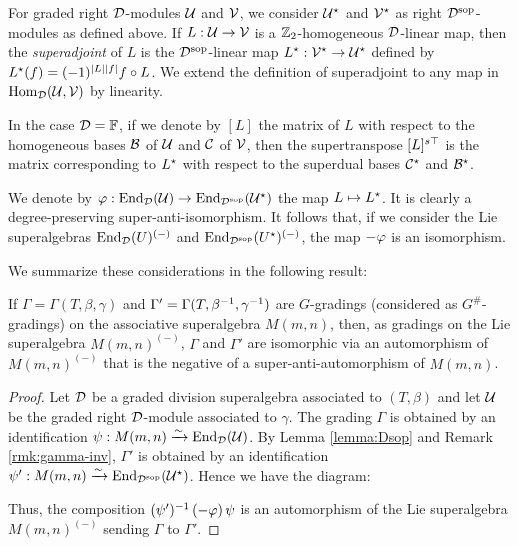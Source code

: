 For graded right $\mathcal{D}$-modules $\mathcal U$ and $\mathcal V$, we consider $\mathcal U^\star$ and $\mathcal V^\star$ as right $\mathcal{D}^{\mathrm{sop}}$-modules as defined above. If $L:\mathcal U \rightarrow \mathcal V$ is a $\mathbb{Z}_2$-homogeneous $\mathcal{D}$-linear map, then the \emph{superadjoint} of $L$ is the $\mathcal{D}^{\mathrm{sop}}$-linear map $L^\star: \mathcal V^\star \rightarrow \mathcal U^\star$ defined by $L^\star (f) = (-1)^{|L||f|} f \circ L$. We extend the definition of superadjoint to any map in $\operatorname{Hom}_{\mathcal{D}} (\mathcal U, \mathcal V)$ by linearity.

\begin{remark}
	In the case $\mathcal{D}=\mathbb{F}$, if we denote by $[L]$ the matrix of $L$ with respect to the homogeneous bases $\mathcal B$ of $\mathcal U$ and $\mathcal C$ of $\mathcal V$, then the supertranspose $[L]^{s\top}$ is the matrix corresponding to $L^\star$ with respect to the superdual bases $\mathcal C^\star$ and $\mathcal B^\star$.
\end{remark}

We denote by $\varphi: \operatorname{End}_{\mathcal{D}} (\mathcal U) \rightarrow \operatorname{End}_{\mathcal{D}^{\mathrm{sop}}} (\mathcal U^\star)$ the map $L \mapsto L^\star$. It is clearly a degree-preserving super-anti-isomorphism. It follows that, if we consider the Lie superalgebras $\operatorname{End}_{\mathcal{D}} (U)^{(-)}$ and $\operatorname{End}_{\mathcal{D}^{\mathrm{sop}}} (U^\star)^{(-)}$, the map $-\varphi$ is an isomorphism.

We summarize these considerations in the following result:

\begin{lemma}\label{lemma:iso-inv}
	If $\Gamma = \Gamma(T,\beta,\gamma)$ and $\Gamma' = \Gamma(T,\beta^{-1},\gamma^{-1})$ are $G$-gradings (considered as $G^\#$-gradings) on the associative superalgebra $M(m,n)$, then, as gradings on the Lie superalgebra $M(m,n)^{(-)}$, $\Gamma$ and $\Gamma'$ are isomorphic via an automorphism of $M(m,n)^{(-)}$ that is the negative of a super-anti-automorphism of 	$M(m,n)$.
\end{lemma}

\begin{proof}
	Let $\mathcal{D}$ be a graded division superalgebra associated to $(T,\beta)$ and let $\mathcal U$ be the graded right $\mathcal{D}$-module associated to $\gamma$. The grading $\Gamma$ is obtained by an identification $\psi: M(m, n) \xrightarrow{\sim} \operatorname{End}_{\mathcal{D}} (\mathcal U)$. By Lemma \ref{lemma:Dsop} and Remark \ref{rmk:gamma-inv}, $\Gamma'$ is obtained by an identification $\psi': M(m, n) \xrightarrow{\sim} \operatorname{End}_{\mathcal{D}^{\mathrm{sop}}} (\mathcal U^\star)$. Hence we have the diagram:

	\begin{center}
	\end{center}

	Thus, the composition $(\psi')^{-1} \, (-\varphi) \, \psi$ is an automorphism of the Lie superalgebra $M(m,n)^{(-)}$ sending $\Gamma$ to $\Gamma'$.
\end{proof}

